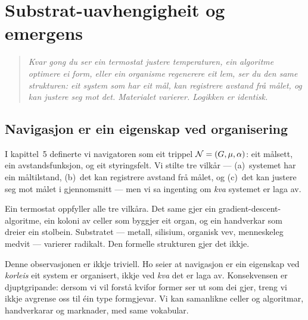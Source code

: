 

\chapter{Substrat-uavhengigheit og emergens}
\label{chap:substrat}

\begin{quote}
\itshape
Kvar gong du ser ein termostat justere temperaturen, ein algoritme
optimere ei form, eller ein organisme regenerere eit lem, ser du
den same strukturen: eit system som har eit mål, kan registrere
avstand frå målet, og kan justere seg mot det. Materialet varierer.
Logikken er identisk.
\end{quote}

\section{Navigasjon er ein eigenskap ved organisering}

I kapittel~5 definerte vi navigatoren som eit trippel
$\mathcal{N} = (G, \mu, \alpha)$: eit målsett, ein avstandsfunksjon,
og eit styringsfelt. Vi stilte tre vilkår --- (a)~systemet har ein
måltilstand, (b)~det kan registrere avstand frå målet, og (c)~det
kan justere seg mot målet i gjennomsnitt --- men vi sa ingenting
om \emph{kva} systemet er laga av.

Ein termostat oppfyller alle tre vilkåra. Det same gjer ein
gradient-descent-algoritme, ein koloni av celler som byggjer eit
organ, og ein handverkar som dreier ein stolbein. Substratet --- metall,
silisium, organisk vev, menneskeleg medvit --- varierer radikalt.
Den formelle strukturen gjer det ikkje.

Denne observasjonen er ikkje triviell. Ho seier at navigasjon er
ein eigenskap ved \emph{korleis} eit system er organisert, ikkje
ved \emph{kva} det er laga av. Konsekvensen er djuptgripande:
dersom vi vil forstå kvifor former ser ut som dei gjer, treng vi
ikkje avgrense oss til éin type formgjevar. Vi kan samanlikne
celler og algoritmar, handverkarar og marknader, med same
vokabular.


